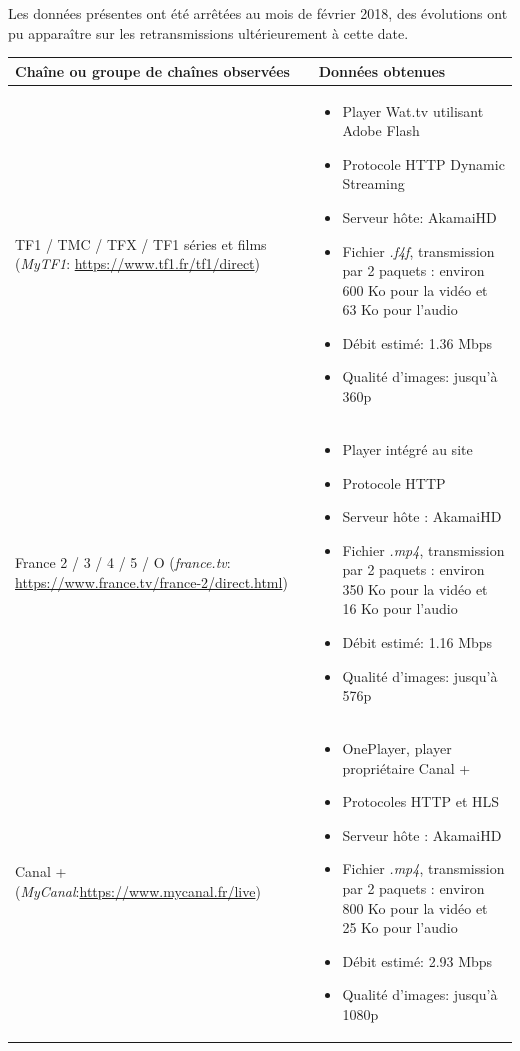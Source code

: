 \documentclass{polytech/polytech}
\begin{document}
Les données présentes ont été arrêtées au mois de février 2018, des évolutions ont pu apparaître sur les retransmissions ultérieurement à cette date.


\begin{longtabu}{|X|X[1.15]|}
	\hline
	Chaîne ou groupe de chaînes observées & Données obtenues \\
	\endhead
	\hline
	TF1 / TMC / TFX / TF1 séries et films (\textit{MyTF1}: \url{https://www.tf1.fr/tf1/direct})
& \begin{itemize}
	\item Player Wat.tv utilisant Adobe Flash
	\item Protocole HTTP Dynamic Streaming
	\item Serveur hôte: AkamaiHD
	\item Fichier \textit{.f4f}, transmission par 2 paquets : environ 600 Ko pour la vidéo et 63 Ko pour l'audio
	\item Débit estimé: 1.36 Mbps
	\item Qualité d'images: jusqu'à 360p	
\end{itemize} \\ 
\hline
France 2 / 3 / 4 / 5 / O (\textit{france.tv}: \url{https://www.france.tv/france-2/direct.html})
& \begin{itemize}
	\item Player intégré au site
	\item Protocole HTTP
	\item Serveur hôte : AkamaiHD
	\item Fichier \textit{.mp4}, transmission par 2 paquets : environ 350 Ko pour la vidéo et 16 Ko pour l'audio
	\item Débit estimé: 1.16 Mbps
	\item Qualité d'images: jusqu'à 576p	
\end{itemize} \\ 
\hline
Canal + (\textit{MyCanal}:\url{https://www.mycanal.fr/live})
& \begin{itemize}
	\item OnePlayer, player propriétaire Canal +
	\item Protocoles HTTP et HLS
	\item Serveur hôte : AkamaiHD
	\item Fichier \textit{.mp4}, transmission par 2 paquets : environ 800 Ko pour la vidéo et 25 Ko pour l'audio
	\item Débit estimé: 2.93 Mbps
	\item Qualité d'images: jusqu'à 1080p	
\end{itemize} \\

\end{longtabu}
\end{document}

